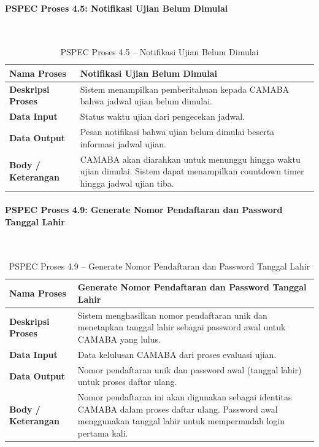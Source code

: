 \paragraph{PSPEC Proses 4.5: Notifikasi Ujian Belum Dimulai}~\\
\begin{longtable}{|p{}|p{}|}
	\caption{PSPEC Proses 4.5 -- Notifikasi Ujian Belum Dimulai}
	\label{table:3.pspec45}\\
	\hline
	\textbf{Nama Proses} & Notifikasi Ujian Belum Dimulai \\
	\hline
	\textbf{Deskripsi Proses} & Sistem menampilkan pemberitahuan kepada CAMABA bahwa jadwal ujian belum dimulai. \\
	\hline
	\textbf{Data Input} & Status waktu ujian dari pengecekan jadwal. \\
	\hline
	\textbf{Data Output} & Pesan notifikasi bahwa ujian belum dimulai beserta informasi jadwal ujian. \\
	\hline
	\textbf{Body / Keterangan} & CAMABA akan diarahkan untuk menunggu hingga waktu ujian dimulai. Sistem dapat menampilkan countdown timer hingga jadwal ujian tiba. \\
	\hline
\end{longtable}

\paragraph{PSPEC Proses 4.9: Generate Nomor Pendaftaran dan Password Tanggal Lahir}~\\
\begin{longtable}{|p{}|p{}|}
	\caption{PSPEC Proses 4.9 -- Generate Nomor Pendaftaran dan Password Tanggal Lahir}
	\label{table:3.pspec49}\\
	\hline
	\textbf{Nama Proses} & Generate Nomor Pendaftaran dan Password Tanggal Lahir \\
	\hline
	\textbf{Deskripsi Proses} & Sistem menghasilkan nomor pendaftaran unik dan menetapkan tanggal lahir sebagai password awal untuk CAMABA yang lulus. \\
	\hline
	\textbf{Data Input} & Data kelulusan CAMABA dari proses evaluasi ujian. \\
	\hline
	\textbf{Data Output} & Nomor pendaftaran unik dan password awal (tanggal lahir) untuk proses daftar ulang. \\
	\hline
	\textbf{Body / Keterangan} & Nomor pendaftaran ini akan digunakan sebagai identitas CAMABA dalam proses daftar ulang. Password awal menggunakan tanggal lahir untuk mempermudah login pertama kali. \\
	\hline
\end{longtable}


